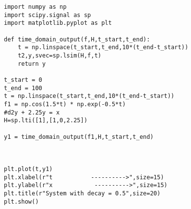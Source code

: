 \documentclass[11pt]{article}
\begin{document}
		
	
		
			
		
	
		
			
		
	
		
			
		
	
	\begin{Verbatim}
import numpy as np
import scipy.signal as sp
import matplotlib.pyplot as plt

def time_domain_output(f,H,t_start,t_end):
    t = np.linspace(t_start,t_end,10*(t_end-t_start))
    t2,y,svec=sp.lsim(H,f,t)
    return y
    
t_start = 0
t_end = 100
t = np.linspace(t_start,t_end,10*(t_end-t_start))
f1 = np.cos(1.5*t) * np.exp(-0.5*t)
#d2y + 2.25y = x
H=sp.lti([1],[1,0,2.25])

y1 = time_domain_output(f1,H,t_start,t_end)



plt.plot(t,y1)
plt.xlabel(r"t           ---------->",size=15)
plt.ylabel(r"x            ---------->",size=15)
plt.title(r"System with decay = 0.5",size=20)
plt.show()
\end{Verbatim}

	

	

	
		
	
	
		
			
		
	
	
	
		
	
	
		
	
		
			
		
	
		
			
		
	
		
			
		
	
		
			
		
	
		
			
		
	
		
			
		
	
		
			
		
	
	
	

	

	
		
	
	
		
			
		
	
\end{document}
